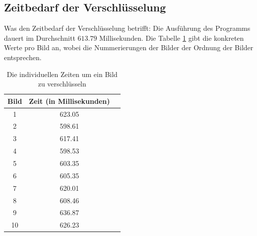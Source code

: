 \subsection{Zeitbedarf der Verschlüsselung}
Was den Zeitbedarf der Verschlüsselung betrifft: Die Ausführung des Programms dauert im Durchschnitt
$613.79$ Millisekunden.
Die Tabelle \ref{tab:speed3} gibt die konkreten Werte pro Bild an, wobei die Nummerierungen der Bilder
der Ordnung der Bilder entsprechen.
\begin{table}
	\begin{center}
		\begin{tabular}{ |c|c|c| } 
		\hline
		Bild & Zeit (in Millisekunden) \\
		\hline
		1 & 623.05 \\
		2 & 598.61 \\
		3 & 617.41\\
		4 & 598.53\\
		5 & 603.35\\
		6 & 605.35\\
		7 & 620.01\\
		8 & 608.46\\
		9 & 636.87\\
		10 & 626.23\\
		\hline
		\end{tabular}
	\end{center}
	\caption{Die individuellen Zeiten um ein Bild zu verschlüsseln}
	\label{tab:speed3}
\end{table}

